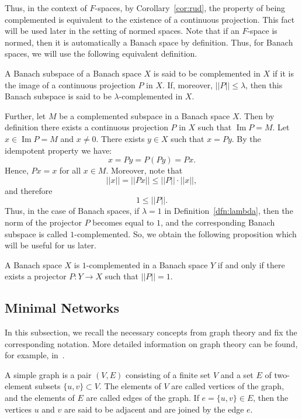 \documentclass{svproc}
\def\Im{\operatorname{Im}}
\begin{document}
Thus, in the context of $F$-spaces, by Corollary~\ref{cor:rud}, the property of being complemented is equivalent to the existence of a continuous projection. This fact will be used later in the setting of normed spaces. Note that if an $F$-space is normed, then it is automatically a Banach space by definition. Thus, for Banach spaces, we will use the following equivalent definition.

\begin{definition}\label{dfn:lambda}
A Banach subspace of a Banach space $X$ is said to be complemented in $X$ if it is the image of a continuous projection $P$ in $X$. If, moreover, $||P||\le \lambda$, then this Banach subspace is said to be $\lambda$-complemented in $X$.
\end{definition}

Further, let $M$ be a complemented subspace in a Banach space $X$. Then by definition there exists a continuous projection $P$ in $X$ such that $\Im P = M$. Let $x\in \Im P = M$ and $x\neq 0$. There exists $y\in X$ such that $x = Py$. By the idempotent property we have:
$$x = Py = P(Py) = Px.$$
Hence, $Px = x$ for all $x\in M$. Moreover, note that
$$||x|| = ||Px|| \le ||P|| \cdot ||x||,$$
and therefore
$$1 \le ||P||.$$
Thus, in the case of Banach spaces, if $\lambda = 1$ in Definition~\ref{dfn:lambda}, then the norm of the projector $P$ becomes equal to $1$, and the corresponding Banach subspace is called $1$-complemented. So, we obtain the following proposition which will be useful for us later.

\begin{proposition}\label{prop:one_comp}
A Banach space $X$ is $1$-complemented in a Banach space $Y$ if and only if there exists a projector $P\colon Y\rightarrow X$ such that $||P|| = 1$.
\end{proposition}


\subsection{Minimal Networks}

In this subsection, we recall the necessary concepts from graph theory and fix the corresponding notation. More detailed information on graph theory can be found, for example, in~\cite{Graphs}.

\begin{definition}
A simple graph is a pair $(V, E)$ consisting of a finite set $V$ and a set $E$ of two-element subsets $\{u, v\} \subset V$. The elements of $V$ are called vertices of the graph, and the elements of $E$ are called edges of the graph. If $e = \{u, v\} \in E$, then the vertices $u$ and $v$ are said to be adjacent and are joined by the edge $e$.
\end{definition}
\end{document}
